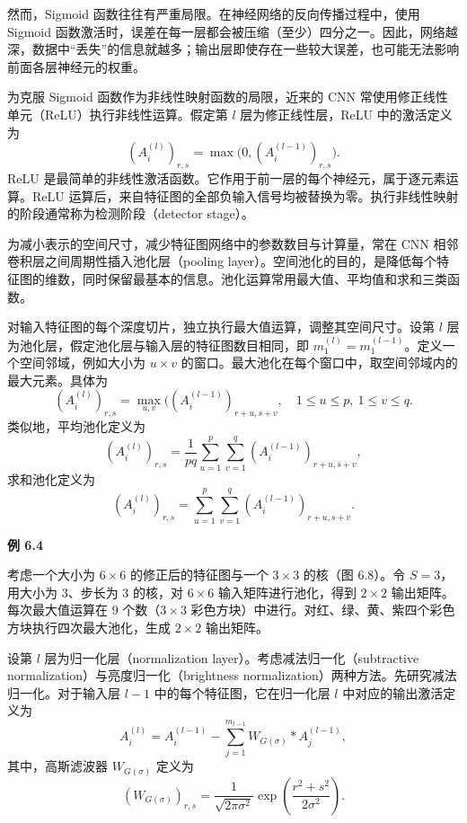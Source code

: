然而，Sigmoid 函数往往有严重局限。在神经网络的反向传播过程中，使用 Sigmoid 函数激活时，误差在每一层都会被压缩（至少）四分之一。因此，网络越深，数据中“丢失”的信息就越多；输出层即使存在一些较大误差，也可能无法影响前面各层神经元的权重。

为克服 Sigmoid 函数作为非线性映射函数的局限，近来的 CNN 常使用修正线性单元（ReLU）执行非线性运算。假定第 $l$ 层为修正线性层，ReLU 中的激活定义为
\begin{equation}
(A_i^{(l)})_{r,s}=\max\bigl(0,(A_i^{(l-1)})_{r,s}\bigr).
\tag{6.93}
\end{equation}
ReLU 是最简单的非线性激活函数。它作用于前一层的每个神经元，属于逐元素运算。ReLU 运算后，来自特征图的全部负输入信号均被替换为零。执行非线性映射的阶段通常称为检测阶段（detector stage）。


为减小表示的空间尺寸，减少特征图网络中的参数数目与计算量，常在 CNN 相邻卷积层之间周期性插入池化层（pooling layer）。空间池化的目的，是降低每个特征图的维数，同时保留最基本的信息。池化运算常用最大值、平均值和求和三类函数。

对输入特征图的每个深度切片，独立执行最大值运算，调整其空间尺寸。设第 $l$ 层为池化层，假定池化层与输入层的特征图数目相同，即 $m_1^{(l)}=m_1^{(l-1)}$。定义一个空间邻域，例如大小为 $u\times v$ 的窗口。最大池化在每个窗口中，取空间邻域内的最大元素。具体为
\begin{equation}
(A_i^{(l)})_{r,s}=\max_{u,v}\bigl((A_i^{(l-1)})_{r+u,s+v},\quad1\leq u\leq p,\ 1\leq v\leq q.
\tag{6.94}
\end{equation}
类似地，平均池化定义为
\begin{equation}
(A_i^{(l)})_{r,s}=\frac1{pq}\sum_{u=1}^p\sum_{v=1}^q(A_i^{(l-1)})_{r+u,s+v},
\tag{6.95}
\end{equation}
求和池化定义为
\begin{equation}
(A_i^{(l)})_{r,s}=\sum_{u=1}^p\sum_{v=1}^q(A_i^{(l-1)})_{r+u,s+v}.
\tag{6.96}
\end{equation}

\noindent\textbf{例 6.4}

考虑一个大小为 $6\times6$ 的修正后的特征图与一个 $3\times3$ 的核（图 6.8）。令 $S=3$，用大小为 3、步长为 3 的核，对 $6\times6$ 输入矩阵进行池化，得到 $2\times2$ 输出矩阵。每次最大值运算在 9 个数（$3\times3$ 彩色方块）中进行。对红、绿、黄、紫四个彩色方块执行四次最大池化，生成 $2\times2$ 输出矩阵。



设第 $l$ 层为归一化层（normalization layer）。考虑减法归一化（subtractive normalization）与亮度归一化（brightness normalization）两种方法。先研究减法归一化。对于输入层 $l-1$ 中的每个特征图，它在归一化层 $l$ 中对应的输出激活定义为
\begin{equation}
A_i^{(l)}=A_i^{(l-1)}-\sum_{j=1}^{m_{l-1}}W_{G(\sigma)}*A_j^{(l-1)},
\tag{6.97}
\end{equation}
其中，高斯滤波器 $W_{G(\sigma)}$ 定义为
\[
(W_{G(\sigma)})_{r,s}=\frac1{\sqrt{2\pi\sigma^2}}\exp\left(\frac{r^2+s^2}{2\sigma^2}\right).
\]
